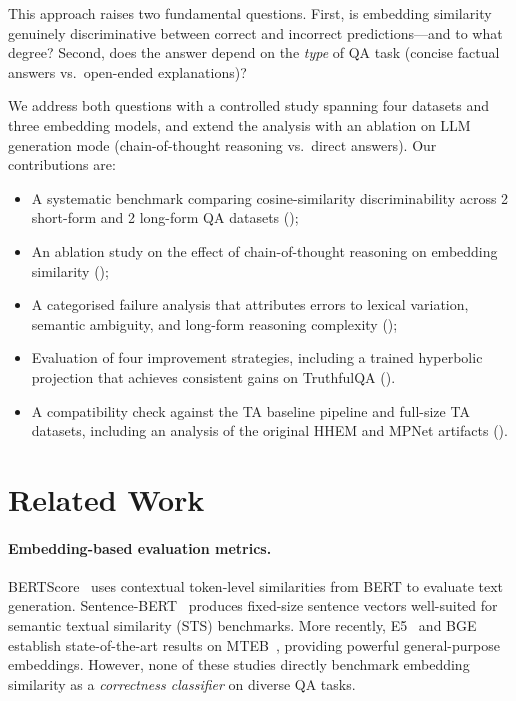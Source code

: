 \documentclass[11pt,a4paper]{article}
\begin{document}
This approach raises two fundamental questions.
First, is embedding similarity genuinely discriminative between correct and incorrect
predictions—and to what degree?
Second, does the answer depend on the \emph{type} of QA task (concise factual answers
vs.\ open-ended explanations)?

We address both questions with a controlled study spanning four datasets and three
embedding models, and extend the analysis with an ablation on LLM generation mode
(chain-of-thought reasoning vs.\ direct answers).
Our contributions are:
\begin{itemize}[nosep]
  \item A systematic benchmark comparing cosine-similarity discriminability across
        2 short-form and 2 long-form QA datasets ();
  \item An ablation study on the effect of chain-of-thought reasoning on embedding
        similarity ();
  \item A categorised failure analysis that attributes errors to lexical variation,
        semantic ambiguity, and long-form reasoning complexity
        ();
  \item Evaluation of four improvement strategies, including a trained hyperbolic
        projection that achieves consistent gains on TruthfulQA
        ().
  \item A compatibility check against the TA baseline pipeline and full-size TA
        datasets, including an analysis of the original HHEM and MPNet artifacts
        ().
\end{itemize}

\section{Related Work}
\label{sec:related}

\paragraph{Embedding-based evaluation metrics.}
BERTScore~\citep{zhang2019bertscore} uses contextual token-level similarities from
BERT to evaluate text generation.
Sentence-BERT~\citep{reimers2019sentencebert} produces fixed-size sentence vectors
well-suited for semantic textual similarity (STS) benchmarks.
More recently, E5~\citep{wang2022text} and BGE~\citep{xiao2023cpack} establish
state-of-the-art results on MTEB~\citep{muennighoff2022mteb}, providing powerful
general-purpose embeddings.
However, none of these studies directly benchmark embedding similarity as a
\emph{correctness classifier} on diverse QA tasks.
\end{document}

